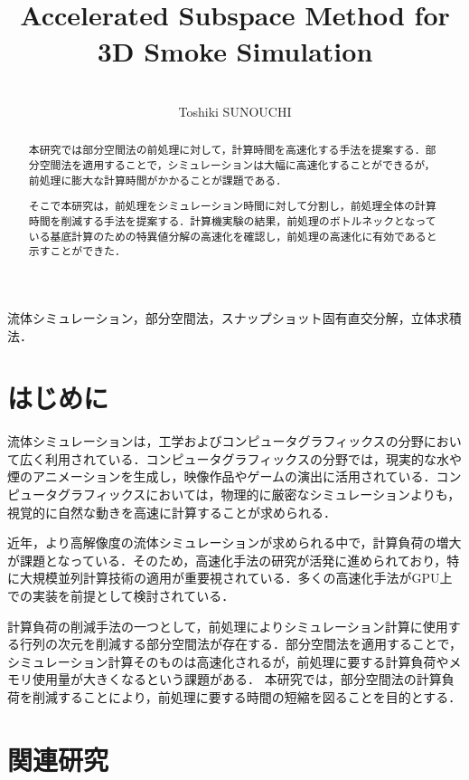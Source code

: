 \documentclass[uplatex,dvipdfmx,10pt,a4paper,notitlepage,oneside,twocolumn]{abst_jsarticle}
\title{
\textbf{\textgt{煙シミュレーションのための部分空間法の高速化}}\\
\textsf{Accelerated Subspace Method for 3D Smoke Simulation}\\
}
\author{
{\large \textbf{\textgt{情報工学専攻　須之内　俊樹}}}\\
{\large \textsf{Toshiki SUNOUCHI}}
}
\date{}
\begin{document}
\maketitle
\thispagestyle{firstpage}

\begin{abstract}
本研究では部分空間法の前処理に対して，計算時間を高速化する手法を提案する．部分空間法を適用することで，シミュレーションは大幅に高速化することができるが，前処理に膨大な計算時間がかかることが課題である．

そこで本研究は，前処理をシミュレーション時間に対して分割し，前処理全体の計算時間を削減する手法を提案する．計算機実験の結果，前処理のボトルネックとなっている基底計算のための特異値分解の高速化を確認し，前処理の高速化に有効であると示すことができた．
\end{abstract}


\vspace{1zw} \noindent
\textbf{} 
流体シミュレーション，部分空間法，スナップショット固有直交分解，立体求積法．


\section{はじめに} \label{sec:section1}

流体シミュレーションは，工学およびコンピュータグラフィックスの分野において広く利用されている．コンピュータグラフィックスの分野では，現実的な水や煙のアニメーションを生成し，映像作品やゲームの演出に活用されている．コンピュータグラフィックスにおいては，物理的に厳密なシミュレーションよりも，視覚的に自然な動きを高速に計算することが求められる．

近年，より高解像度の流体シミュレーションが求められる中で，計算負荷の増大が課題となっている．そのため，高速化手法の研究が活発に進められており，特に大規模並列計算技術の適用が重要視されている．多くの高速化手法がGPU上での実装を前提として検討されている．

計算負荷の削減手法の一つとして，前処理によりシミュレーション計算に使用する行列の次元を削減する部分空間法が存在する．部分空間法を適用することで，シミュレーション計算そのものは高速化されるが，前処理に要する計算負荷やメモリ使用量が大きくなるという課題がある．
本研究では，部分空間法の計算負荷を削減することにより，前処理に要する時間の短縮を図ることを目的とする．

\section{関連研究}
\end{document}
